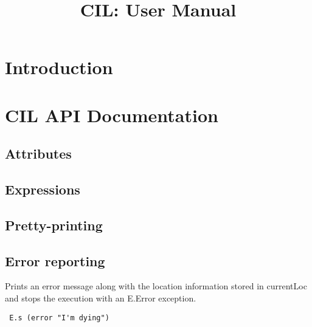\documentclass{article}
\title{CIL: User Manual}
\def\t#1{{\tt #1}}
\def\apival#1:#2{\t{#1} : \t{#2}}
\def\apiref#1{#1}
\begin{document}
\maketitle
\section{Introduction}


\section{CIL API Documentation} 
 
\subsection{Attributes}

\subsection{Expressions}

\subsection{Pretty-printing}

\subsection{Error reporting}


 Prints an error message along with the location information stored in
 \apiref{currentLoc} and stops the execution with an \apiref{E.Error}
 exception. 

\begin{verbatim}
 E.s (error "I'm dying")
\end{verbatim}
\end{document}

